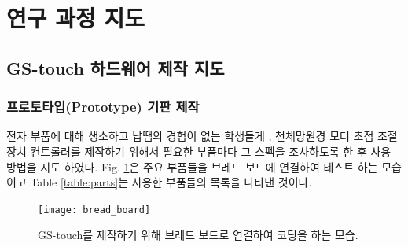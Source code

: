 



\section{연구 과정 지도}

\subsection{GS-touch 하드웨어 제작 지도}

\subsubsection{프로토타입(Prototype) 기판 제작}

전자 부품에 대해 생소하고 납땜의 경험이 없는 학생들게 , 천체망원경 모터 초점 조절 장치 컨트롤러를 제작하기 위해서 필요한 부품마다 그 스펙을 조사하도록 한 후 사용 방법을 지도 하였다. Fig. \ref{fig:bread}은 주요 부품들을 브레드 보드에 연결하여 테스트 하는 모습이고 Table \ref{table:parts}는 사용한 부품들의 목록을 나타낸 것이다.

\begin{figure}[h]
	\begin{center}
		{\texttt{[image: bread\_board]}} 
	\end{center}
	\caption{GS-touch를 제작하기 위해 브레드 보드로 연결하여 코딩을 하는 모습.}
	\label{fig:bread}
\end{figure}

